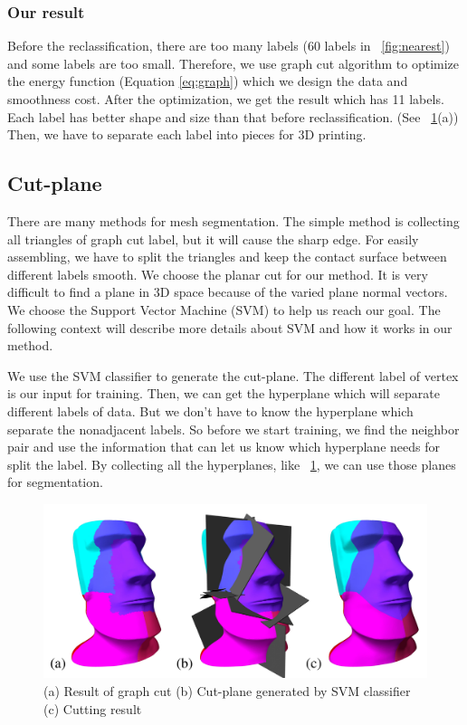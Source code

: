 \subsubsection{Our result}
Before the reclassification, there are too many labels (60 labels in \figname~\ref{fig:nearest}) and some labels are too small. Therefore, we use graph cut algorithm to optimize the energy function (Equation \ref{eq:graph}) which we design the data and smoothness cost. After the optimization, we get the result which has 11 labels. Each label has better shape and size than that before reclassification. (See \figname~\ref{fig:cut_plane}(a)) Then, we have to separate each label into pieces for 3{D} printing.

\subsection{Cut-plane}
There are many methods for mesh segmentation. The simple method is collecting all triangles of graph cut label, but it will cause the sharp edge. For easily assembling, we have to split the triangles and keep the contact surface between different labels smooth. We choose the planar cut for our method. It is very difficult to find a plane in 3{D} space because of the varied plane normal vectors. We choose the Support Vector Machine (SVM) to help us reach our goal. The following context will describe more details about SVM and how it works in our method.

We use the SVM classifier to generate the cut-plane. The different label of vertex is our input for training. Then, we can get the hyperplane which will separate different labels of data. But we don't have to know the hyperplane which separate the nonadjacent labels. So before we start training, we find the neighbor pair and use the information that can let us know which hyperplane needs for split the label.  By collecting all the hyperplanes, like \figname~\ref{fig:cut_plane}, we can use those planes for segmentation.

\begin{figure}[ht]
\centering
\includegraphics[width=1.0\linewidth]{figs/cut_plane1.pdf} 
\caption{(a) Result of graph cut (b) Cut-plane generated by SVM classifier (c) Cutting result} 
\label{fig:cut_plane}
\end{figure}

